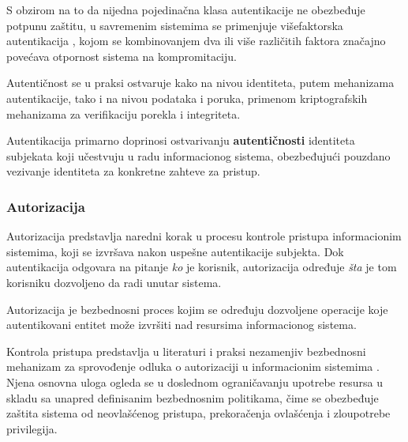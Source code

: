 S obzirom na to da nijedna pojedinačna klasa autentikacije ne obezbeđuje potpunu zaštitu, u savremenim sistemima se primenjuje višefaktorska autentikacija \cite{ometov2018multi} , kojom se kombinovanjem dva ili više različitih faktora značajno povećava otpornost sistema na kompromitaciju.

Autentičnost se u praksi ostvaruje kako na nivou identiteta, putem mehanizama autentikacije, tako i na nivou podataka i poruka, primenom kriptografskih mehanizama za verifikaciju porekla i integriteta.

Autentikacija primarno doprinosi ostvarivanju \textbf{autentičnosti} identiteta subjekata koji učestvuju u radu informacionog sistema, obezbeđujući pouzdano vezivanje identiteta za konkretne zahteve za pristup.

\subsubsection{Autorizacija}
Autorizacija predstavlja naredni korak u procesu kontrole pristupa informacionim sistemima, koji se izvršava nakon uspešne autentikacije subjekta. Dok autentikacija odgovara na pitanje \textit{ko} je korisnik, autorizacija određuje \textit{šta} je tom korisniku dozvoljeno da radi unutar sistema.

\begin{definicija}
Autorizacija je bezbednosni proces kojim se određuju dozvoljene operacije koje autentikovani entitet može izvršiti nad resursima informacionog sistema.
\end{definicija}

Kontrola pristupa  predstavlja u literaturi i praksi nezamenjiv bezbednosni mehanizam za sprovođenje odluka o autorizaciji u informacionim sistemima \cite{lampson1974protection}. Njena osnovna uloga ogleda se u doslednom ograničavanju upotrebe resursa u skladu sa unapred definisanim bezbednosnim politikama, čime se obezbeđuje zaštita sistema od neovlašćenog pristupa, prekoračenja ovlašćenja i zloupotrebe privilegija.

